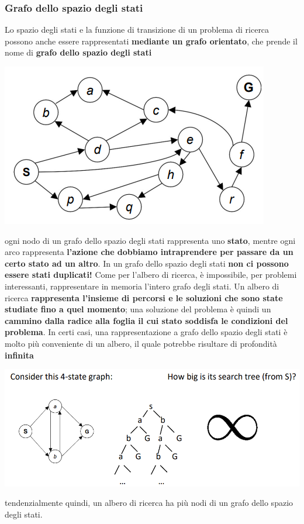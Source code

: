 \documentclass[12pt]{article}
\begin{document}
\subsubsection{Grafo dello spazio degli stati}
Lo spazio degli stati e la funzione di transizione di un problema di ricerca possono anche essere rappresentati
\textbf{mediante un grafo orientato}, che prende il nome di \textbf{grafo dello spazio degli stati}
\begin{center}
    \includegraphics[width = 0.50\linewidth]{Images/36.PNG}
\end{center}
ogni nodo di un grafo dello spazio degli stati rappresenta uno \textbf{stato}, mentre ogni arco rappresenta \textbf{l'azione che dobbiamo intraprendere per passare da un certo stato ad un altro}.
In un grafo dello spazio degli stati \textbf{non ci possono essere stati duplicati!}
Come per l'albero di ricerca, è impossibile, per problemi interessanti, rappresentare in memoria l'intero grafo degli stati.
Un albero di ricerca \textbf{rappresenta l'insieme di percorsi e le soluzioni che sono state studiate fino a quel momento}; una soluzione del problema è quindi un \textbf{cammino dalla radice alla foglia il cui stato soddisfa le condizioni del problema}.
In certi casi, una rappresentazione a grafo dello spazio degli stati è molto più conveniente di un albero, il quale potrebbe risultare di profondità \textbf{infinita}
\begin{center}
    \includegraphics[width = 0.65\linewidth]{Images/37.PNG}
\end{center}
tendenzialmente quindi, un albero di ricerca ha più nodi di un grafo dello spazio degli stati.
\end{document}
